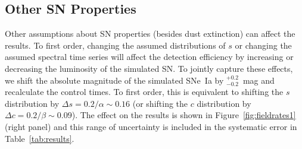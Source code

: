 \subsection{Other SN Properties}

Other assumptions about SN properties (besides dust extinction) can
affect the results. To first order, changing the assumed distributions
of $s$ or changing the assumed spectral time series will affect the
detection efficiency by increasing or decreasing the luminosity of the
simulated SN. To jointly capture these effects, we shift the absolute
magnitude of the simulated SNe~Ia by $^{+0.2}_{-0.2}$~mag and
recalculate the control times. To first order, this is equivalent to
shifting the $s$ distribution by $\Delta s = 0.2/\alpha \sim 0.16$ (or
shifting the $c$ distribution by $\Delta c = 0.2/\beta \sim
0.09$). The effect on the results is shown in
Figure~\ref{fig:fieldrates1} (right panel) and this range of
uncertainty is included in the systematic error in
Table~\ref{tab:results}.

\vspace{0.4in}
